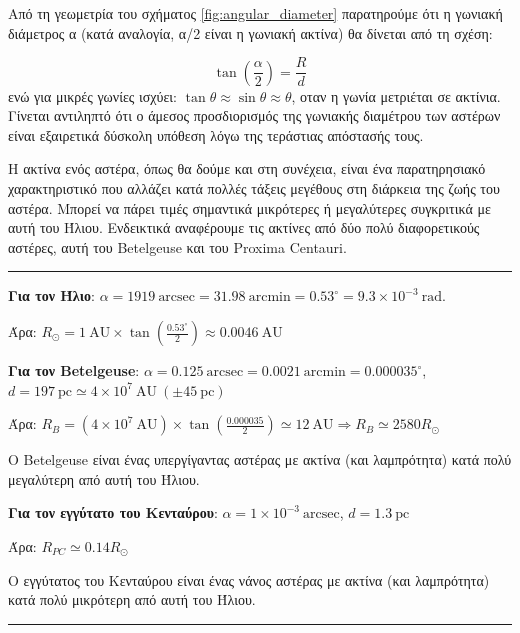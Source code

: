 Από τη γεωμετρία του σχήματος \ref{fig:angular_diameter} παρατηρούμε ότι η γωνιακή διάμετρος α (κατά αναλογία, α/2 είναι η γωνιακή ακτίνα) θα δίνεται από τη σχέση:

\begin{equation}
    \label{eq:angular_diameter}
    \tan \left( \frac{\alpha}{2} \right) = \frac{R}{d}
\end{equation}
ενώ για μικρές γωνίες ισχύει: $\tan \theta \approx \sin \theta \approx \theta$, οταν η γωνία μετριέται σε ακτίνια.
Γίνεται αντιληπτό ότι ο άμεσος προσδιορισμός της γωνιακής διαμέτρου των αστέρων είναι εξαιρετικά δύσκολη υπόθεση λόγω της τεράστιας απόστασής τους.

Η ακτίνα ενός αστέρα, όπως θα δούμε και στη συνέχεια, είναι ένα παρατηρησιακό χαρακτηριστικό που αλλάζει κατά πολλές τάξεις μεγέθους στη διάρκεια της ζωής του αστέρα. Μπορεί να πάρει τιμές σημαντικά μικρότερες ή μεγαλύτερες συγκριτικά με αυτή του Ήλιου. Ενδεικτικά αναφέρουμε τις ακτίνες από δύο πολύ διαφορετικούς αστέρες, αυτή του Betelgeuse και του Proxima Centauri. \\

{\color{red} \hrule}
\textbf{Για τον Ήλιο}: $\alpha = 1919 \ \text{arcsec} = 31.98 \ \text{arcmin} = 0.53^{\circ} = 9.3 \times 10^{-3} \ \text{rad}$.

Άρα: $R_\odot = 1 \ \text{AU} \times \tan \left( \frac{0.53^{\circ}}{2}\right) \approx 0.0046 \ \text{AU}$

\textbf{Για τον Betelgeuse}: $\alpha = 0.125 \ \text{arcsec} = 0.0021 \ \text{arcmin} = 0.000035^{\circ}$, \\ $d=197 \ \text{pc} \simeq 4 \times 10^7 \ \text{AU} \ (\pm 45 \ \text{pc})$

Άρα: $R_B = (4 \times 10^7 \ \text{AU}) \times \tan \left( \frac{0.000035}{2} \right) \simeq 12 \ \text{AU} \Rightarrow R_B \simeq 2580 R_\odot$

O Betelgeuse είναι ένας υπεργίγαντας αστέρας με ακτίνα (και λαμπρότητα) κατά πολύ μεγαλύτερη από αυτή του Ήλιου.

\textbf{Για τον εγγύτατο του Κενταύρου}: $\alpha = 1 \times 10^{-3} \ \text{arcsec}$, $d = 1.3 \ \text{pc}$

Άρα: $R_{PC} \simeq 0.14 R_{\odot}$

Ο εγγύτατος του Κενταύρου είναι ένας νάνος αστέρας με ακτίνα (και λαμπρότητα) κατά πολύ μικρότερη από αυτή του Ήλιου.\\

{\color{red} \hrule}




